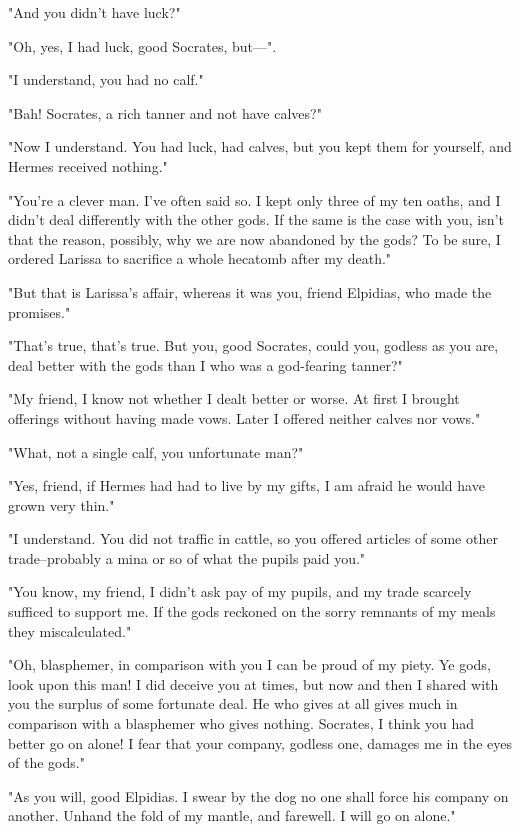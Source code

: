 "And you didn't have luck?"

"Oh, yes, I had luck, good Socrates, but---".

"I understand, you had no calf."

"Bah! Socrates, a rich tanner and not have calves?"

"Now I understand. You had luck, had calves, but you kept them for
yourself, and Hermes received nothing."

"You're a clever man. I've often said so. I kept only three of my ten
oaths, and I didn't deal differently with the other gods. If the same
is the case with you, isn't that the reason, possibly, why we are now
abandoned by the gods? To be sure, I ordered Larissa to sacrifice a
whole hecatomb after my death."

"But that is Larissa's affair, whereas it was you, friend Elpidias,
who made the promises."

"That's true, that's true. But you, good Socrates, could you, godless
as you are, deal better with the gods than I who was a god-fearing
tanner?"

"My friend, I know not whether I dealt better or worse. At first I
brought offerings without having made vows. Later I offered neither
calves nor vows."

"What, not a single calf, you unfortunate man?"

"Yes, friend, if Hermes had had to live by my gifts, I am afraid he
would have grown very thin."

"I understand. You did not traffic in cattle, so you offered articles
of some other trade--probably a mina or so of what the pupils paid
you."

"You know, my friend, I didn't ask pay of my pupils, and my trade
scarcely sufficed to support me. If the gods reckoned on the sorry
remnants of my meals they miscalculated."

"Oh, blasphemer, in comparison with you I can be proud of my piety. Ye
gods, look upon this man! I did deceive you at times, but now and then
I shared with you the surplus of some fortunate deal. He who gives at
all gives much in comparison with a blasphemer who gives nothing.
Socrates, I think you had better go on alone! I fear that your
company, godless one, damages me in the eyes of the gods."

"As you will, good Elpidias. I swear by the dog no one shall force his
company on another. Unhand the fold of my mantle, and farewell. I will
go on alone."

